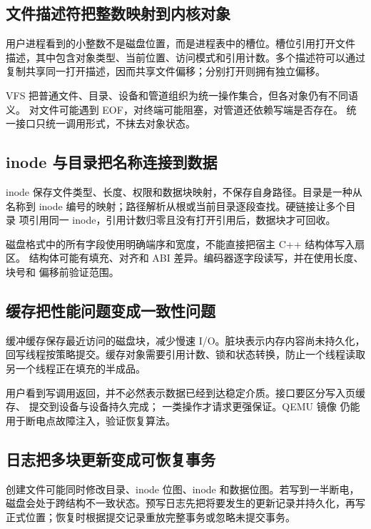 \subsection{文件描述符把整数映射到内核对象}

用户进程看到的小整数不是磁盘位置，而是进程表中的槽位。槽位引用打开文件
描述，其中包含对象类型、当前位置、访问模式和引用计数。多个描述符可以通过
复制共享同一打开描述，因而共享文件偏移；分别打开则拥有独立偏移。

VFS 把普通文件、目录、设备和管道组织为统一操作集合，但各对象仍有不同语义。
 对文件可能遇到 EOF，对终端可能阻塞，对管道还依赖写端是否存在。
统一接口只统一调用形式，不抹去对象状态。

\subsection{inode 与目录把名称连接到数据}

inode 保存文件类型、长度、权限和数据块映射，不保存自身路径。目录是一种从
名称到 inode 编号的映射；路径解析从根或当前目录逐段查找。硬链接让多个目录
项引用同一 inode，引用计数归零且没有打开引用后，数据块才可回收。

磁盘格式中的所有字段使用明确端序和宽度，不能直接把宿主 C++ 结构体写入扇区。
结构体可能有填充、对齐和 ABI 差异。编码器逐字段读写，并在使用长度、块号和
偏移前验证范围。

\subsection{缓存把性能问题变成一致性问题}

缓冲缓存保存最近访问的磁盘块，减少慢速 I/O。脏块表示内存内容尚未持久化，
回写线程按策略提交。缓存对象需要引用计数、锁和状态转换，防止一个线程读取
另一个线程正在填充的半成品。

用户看到写调用返回，并不必然表示数据已经到达稳定介质。接口要区分写入页缓存、
提交到设备与设备持久完成； 一类操作才请求更强保证。QEMU 镜像
仍能用于断电点故障注入，验证恢复算法。

\subsection{日志把多块更新变成可恢复事务}

创建文件可能同时修改目录、inode 位图、inode 和数据位图。若写到一半断电，
磁盘会处于跨结构不一致状态。预写日志先把将要发生的更新记录并持久化，再写
正式位置；恢复时根据提交记录重放完整事务或忽略未提交事务。

